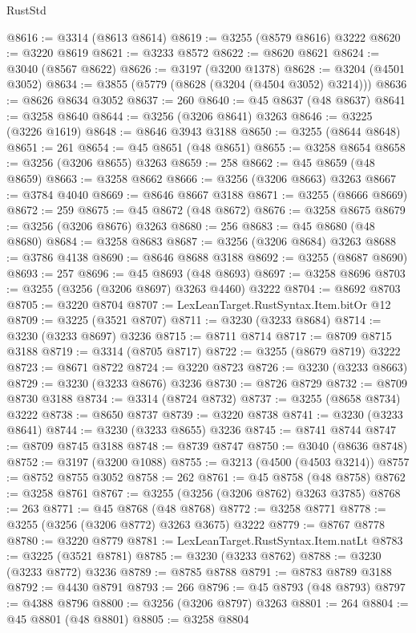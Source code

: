 \begin{lexlean}{RustStd}
\begin{coremodule}
@8616 := @3314 (@8613 @8614)
@8619 := @3255 (@8579 @8616) @3222
@8620 := @3220 @8619
@8621 := @3233 @8572
@8622 := @8620 @8621
@8624 := @3040 (@8567 @8622)
@8626 := @3197 (@3200 @1378)
@8628 := @3204 (@4501 @3052)
@8634 := @3855 (@5779 (@8628 (@3204 (@4504 @3052) @3214)))
@8636 := @8626 @8634 @3052
@8637 := 260
@8640 := @45 @8637 (@48 @8637)
@8641 := @3258 @8640
@8644 := @3256 (@3206 @8641) @3263
@8646 := @3225 (@3226 @1619)
@8648 := @8646 @3943 @3188
@8650 := @3255 (@8644 @8648)
@8651 := 261
@8654 := @45 @8651 (@48 @8651)
@8655 := @3258 @8654
@8658 := @3256 (@3206 @8655) @3263
@8659 := 258
@8662 := @45 @8659 (@48 @8659)
@8663 := @3258 @8662
@8666 := @3256 (@3206 @8663) @3263
@8667 := @3784 @4040
@8669 := @8646 @8667 @3188
@8671 := @3255 (@8666 @8669)
@8672 := 259
@8675 := @45 @8672 (@48 @8672)
@8676 := @3258 @8675
@8679 := @3256 (@3206 @8676) @3263
@8680 := 256
@8683 := @45 @8680 (@48 @8680)
@8684 := @3258 @8683
@8687 := @3256 (@3206 @8684) @3263
@8688 := @3786 @4138
@8690 := @8646 @8688 @3188
@8692 := @3255 (@8687 @8690)
@8693 := 257
@8696 := @45 @8693 (@48 @8693)
@8697 := @3258 @8696
@8703 := @3255 (@3256 (@3206 @8697) @3263 @4460) @3222
@8704 := @8692 @8703
@8705 := @3220 @8704
@8707 := LexLeanTarget.RustSyntax.Item.bitOr @12
@8709 := @3225 (@3521 @8707)
@8711 := @3230 (@3233 @8684)
@8714 := @3230 (@3233 @8697) @3236
@8715 := @8711 @8714
@8717 := @8709 @8715 @3188
@8719 := @3314 (@8705 @8717)
@8722 := @3255 (@8679 @8719) @3222
@8723 := @8671 @8722
@8724 := @3220 @8723
@8726 := @3230 (@3233 @8663)
@8729 := @3230 (@3233 @8676) @3236
@8730 := @8726 @8729
@8732 := @8709 @8730 @3188
@8734 := @3314 (@8724 @8732)
@8737 := @3255 (@8658 @8734) @3222
@8738 := @8650 @8737
@8739 := @3220 @8738
@8741 := @3230 (@3233 @8641)
@8744 := @3230 (@3233 @8655) @3236
@8745 := @8741 @8744
@8747 := @8709 @8745 @3188
@8748 := @8739 @8747
@8750 := @3040 (@8636 @8748)
@8752 := @3197 (@3200 @1088)
@8755 := @3213 (@4500 (@4503 @3214))
@8757 := @8752 @8755 @3052
@8758 := 262
@8761 := @45 @8758 (@48 @8758)
@8762 := @3258 @8761
@8767 := @3255 (@3256 (@3206 @8762) @3263 @3785)
@8768 := 263
@8771 := @45 @8768 (@48 @8768)
@8772 := @3258 @8771
@8778 := @3255 (@3256 (@3206 @8772) @3263 @3675) @3222
@8779 := @8767 @8778
@8780 := @3220 @8779
@8781 := LexLeanTarget.RustSyntax.Item.natLt
@8783 := @3225 (@3521 @8781)
@8785 := @3230 (@3233 @8762)
@8788 := @3230 (@3233 @8772) @3236
@8789 := @8785 @8788
@8791 := @8783 @8789 @3188
@8792 := @4430 @8791
@8793 := 266
@8796 := @45 @8793 (@48 @8793)
@8797 := @4388 @8796
@8800 := @3256 (@3206 @8797) @3263
@8801 := 264
@8804 := @45 @8801 (@48 @8801)
@8805 := @3258 @8804

\end{coremodule}
\end{lexlean}
